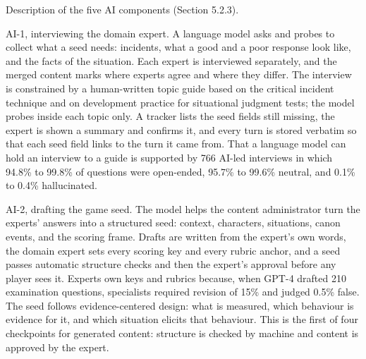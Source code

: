 Description of the five AI components (Section 5.2.3).

AI-1, interviewing the domain expert. A language model asks and probes to collect what a seed needs: incidents, what a good and a poor response look like, and the facts of the situation. Each expert is interviewed separately, and the merged content marks where experts agree and where they differ. The interview is constrained by a human-\allowbreak{}written topic guide based on the critical incident technique\cite{r26} and on development practice for situational judgment tests\cite{r27}; the model probes inside each topic only. A tracker lists the seed fields still missing, the expert is shown a summary and confirms it, and every turn is stored verbatim so that each seed field links to the turn it came from. That a language model can hold an interview to a guide is supported by 766 AI-led interviews in which 94.8\% to 99.8\% of questions were open-ended, 95.7\% to 99.6\% neutral, and 0.1\% to 0.4\% hallucinated\cite{r114}.

AI-2, drafting the game seed. The model helps the content administrator turn the experts' answers into a structured seed: context, characters, situations, canon events, and the scoring frame. Drafts are written from the expert's own words, the domain expert sets every scoring key and every rubric anchor, and a seed passes automatic structure checks and then the expert's approval before any player sees it. Experts own keys and rubrics because, when GPT-4 drafted 210 examination questions, specialists required revision of 15\% and judged 0.5\% false\cite{r115}. The seed follows evidence-\allowbreak{}centered design: what is measured, which behaviour is evidence for it, and which situation elicits that behaviour\cite{r20,r116}. This is the first of four checkpoints for generated content: structure is checked by machine and content is approved by the expert.

